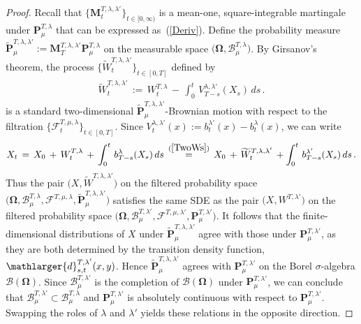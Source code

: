 \documentclass[10pt]{article}
\def\stackrel#1#2{\mathrel{\mathop{#2}\limits^{#1}}}
\numberwithin{equation}{section}
\theoremstyle{definition}
\begin{document}
\begin{proof}  Recall that $\{\mathbf{M}^{T,\lambda,\lambda'}_{t}\}_{t\in [0,\infty)}$ is a mean-one, square-integrable martingale under $\mathbf{P}_{\mu}^{T,\lambda}$ that can be expressed as~(\ref{Deriv}).  Define the probability measure $\mathbf{\widetilde{P}}_{\mu}^{T,\lambda,\lambda'}:=\mathbf{M}^{T,\lambda,\lambda'}_{T}\mathbf{P}_{\mu}^{T,\lambda}$ on the measurable space $\big(\boldsymbol{\Omega}, \mathscr{B}^{T,\lambda}_\mu   \big)$.    By Girsanov's theorem,  the process $\big\{\widetilde{W}_{t}^{T,\lambda,\lambda'}\big\}_{t\in [0,T]} $ defined by
\begin{align}\label{TwoWs}
\widetilde{W}_{t}^{T,\lambda,\lambda'} \,:=\,W_{t}^{T,\lambda} \,-\,\int_0^t\, V_{T-s}^{\lambda,\lambda'}(X_s)\,ds\,. 
\end{align}
is a standard two-dimensional $\mathbf{\widetilde{P}}_{\mu}^{T,\lambda,\lambda'}$-Brownian motion with respect  to the filtration $\big\{ \mathscr{F}^{T,\mu, \lambda}_t \big\}_{t\in [0,T]}$.   Since $V_{t}^{\lambda,\lambda'}(x):=b_t^{\lambda'}(x)-b_t^{\lambda}(x)$, we can write
\begin{align*}
X_t\,= \,X_0\, +\, W_{t}^{T,\lambda}\,+\,\int_0^t \,b^{\lambda}_{T-s}(X_s)\,ds\,\stackrel{(\ref{TwoWs})}{=}\,X_0 \,+ \,\widetilde{W}_{t}^{T,\lambda,\lambda'}\,+\int_0^t\, b^{\lambda'}_{T-s}(X_s)\,ds \,.
\end{align*}
Thus the pair $\big(X ,\widetilde{W}^{T,\lambda,\lambda'} \big)$ on the filtered probability space $\big(\boldsymbol{\Omega}, \mathscr{B}^{T,\lambda}_\mu ,\mathscr{F}^{T,\mu,\lambda},\mathbf{\widetilde{P}}_{\mu}^{T,\lambda,\lambda'}  \big)$ satisfies the same SDE as the pair $\big(X ,W^{T,\lambda'} \big)$ on the filtered probability space $\big(\boldsymbol{\Omega}, \mathscr{B}^{T,\lambda'}_\mu , \mathscr{F}^{T,\mu,\lambda'} ,\mathbf{P}_{\mu}^{T,\lambda'}  \big)$.  It follows that the finite-dimensional distributions of $X$ under $\mathbf{\widetilde{P}}_{\mu}^{T,\lambda,\lambda'}$ agree with those under $\mathbf{P}_{\mu}^{T,\lambda'} $, as they are both determined by the transition density function, $\mathlarger{d}^{T,\lambda'}_{s,t}(x,y)$.
  Hence $\mathbf{\widetilde{P}}_{\mu}^{T,\lambda,\lambda'}$ agrees with $\mathbf{P}_{\mu}^{T,\lambda'} $ on the Borel $\sigma$-algebra $\mathscr{B}(\boldsymbol{\Omega})$.  Since $\mathscr{B}^{T,\lambda'}_\mu $ is the completion of $\mathscr{B}(\boldsymbol{\Omega})$ under $\mathbf{P}_{\mu}^{T,\lambda'} $, we can conclude that $\mathscr{B}^{T,\lambda'}_\mu \subset \mathscr{B}^{T,\lambda}_\mu$ and $\mathbf{P}_{\mu}^{T,\lambda'}$ is absolutely continuous with respect to $\mathbf{P}_{\mu}^{T,\lambda'}$.  Swapping the roles of $\lambda$ and $\lambda'$ yields these relations in the opposite direction.
\end{proof} 
\end{document}
